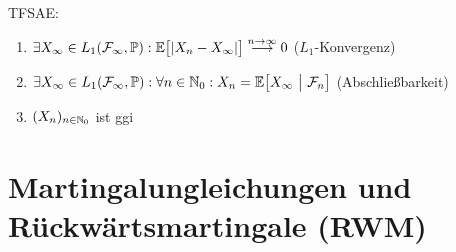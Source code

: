 \documentclass[12pt]{scrartcl}
\begin{document}
\begin{itemize}
		TFSAE:
		\begin{enumerate}[label=(\alph*)]
			\item $\begin{aligned}
				\exists X_\infty\in L_1(\mathcal{F}_\infty,\mathbb{P}):\mathbb{E}\big[|X_n-X_\infty|\big]\stackrel{n\to\infty}{\longrightarrow}0
			\end{aligned}$ ($L_1$-Konvergenz)
			\item $\begin{aligned}
				\exists X_\infty\in L_1(\mathcal{F}_\infty,\mathbb{P}):\forall n\in\mathbb{N}_0: X_n=\mathbb{E}\big[X_\infty~\big|~\mathcal{F}_n\big]
			\end{aligned}$ (Abschließbarkeit)
			\item $\begin{aligned}
				(X_n)_{n\in\mathbb{N}_0}
			\end{aligned}$ ist ggi
		\end{enumerate}
	\end{itemize}
	
	\section{Martingalungleichungen und Rückwärtsmartingale (RWM)}
	
\end{document}
